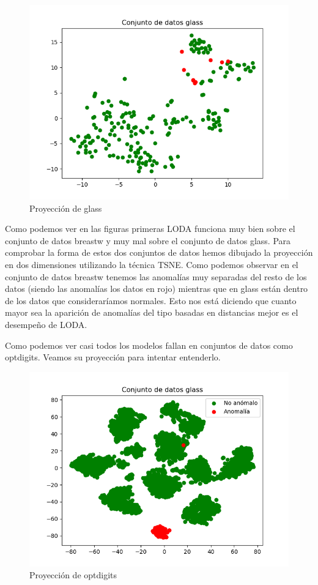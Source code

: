 \begin{figure}[H]
	\centering
	\label{glass}
	\includegraphics[scale=0.7]{imagenes/glass}
	\caption{Proyección de glass}
\end{figure}

Como podemos ver en las figuras primeras LODA funciona muy bien sobre el conjunto de datos breastw y muy mal sobre el conjunto de datos glass. Para comprobar la forma de estos dos conjuntos de datos hemos dibujado la proyección en dos dimensiones utilizando la técnica TSNE. Como podemos observar en el conjunto de datos breastw tenemos las anomalías muy separadas del resto de los datos (siendo las anomalías los datos en rojo) mientras que en glass están dentro de los datos que consideraríamos normales. Esto nos está diciendo que cuanto mayor sea la aparición de anomalías del tipo basadas en distancias mejor es el desempeño de LODA. 

Como podemos ver casi todos los modelos fallan en conjuntos de datos como optdigits. Veamos su proyección para intentar entenderlo.

\begin{figure}[H]
	\centering
	\label{optdigits}
	\includegraphics[scale=0.7]{imagenes/optdigits}
	\caption{Proyección de optdigits}
\end{figure}

